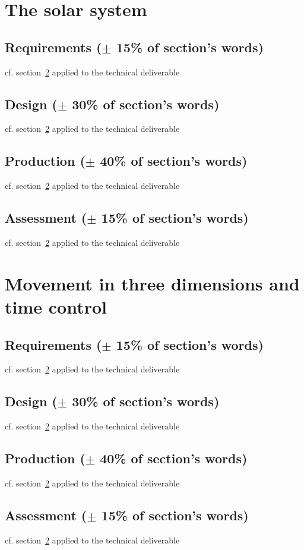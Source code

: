\documentclass[conference,compsoc]{IEEEtran}
\begin{document}
\section{The solar system}
\label{sec-production}
\subsection{Requirements ($\pm$ 15\% of section's words)}
cf. section~\ref{sec-production} applied to the technical deliverable
\subsection{Design ($\pm$ 30\% of section's words)}
cf. section~\ref{sec-production} applied to the technical deliverable
\subsection{Production ($\pm$ 40\% of section's words)}
cf. section~\ref{sec-production} applied to the technical deliverable
\subsection{Assessment ($\pm$ 15\% of section's words)}
cf. section~\ref{sec-production} applied to the technical deliverable

\section{Movement in three dimensions and time control}

\label{sec-production}
\subsection{Requirements ($\pm$ 15\% of section's words)}
cf. section~\ref{sec-production} applied to the technical deliverable
\subsection{Design ($\pm$ 30\% of section's words)}
cf. section~\ref{sec-production} applied to the technical deliverable
\subsection{Production ($\pm$ 40\% of section's words)}
cf. section~\ref{sec-production} applied to the technical deliverable
\subsection{Assessment ($\pm$ 15\% of section's words)}
cf. section~\ref{sec-production} applied to the technical deliverable
\end{document}
